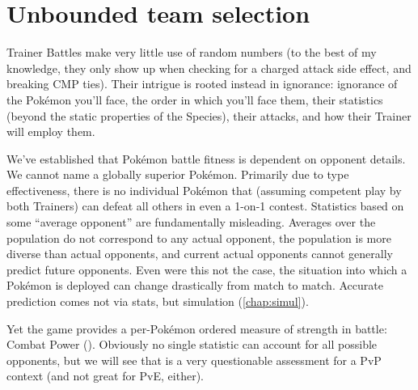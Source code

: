 \chapter{Unbounded team selection\label{chap:unbounded}}
Trainer Battles make very little use of random numbers (to the best of my
 knowledge, they only show up when checking for a charged attack side
 effect, and breaking CMP ties).
Their intrigue is rooted instead in ignorance: ignorance of
 the Pokémon you'll face, the order in which you'll face them,
 their statistics (beyond the static properties of the Species),
 their attacks, and how their Trainer will employ them.

We've established that Pokémon battle fitness is dependent on opponent details.
We cannot name a globally superior Pokémon.
Primarily due to type effectiveness, there is no individual Pokémon that
  (assuming competent play by both Trainers) can defeat all others in even a
  1-on-1 contest.
Statistics based on some ``average opponent'' are fundamentally misleading.
Averages over the population do not correspond to any actual opponent,
 the population is more diverse than actual opponents,
 and current actual opponents cannot generally predict future opponents.
Even were this not the case, the situation into which a Pokémon is deployed
 can change drastically from match to match.
Accurate prediction comes not via stats, but simulation (\autoref{chap:simul}).

Yet the game provides a per-Pokémon ordered measure of strength in battle: Combat Power (\CP).
Obviously no single statistic can account for all possible opponents, but
 we will see that \CP{} is a very questionable assessment for a PvP
 context (and not great for PvE, either).

